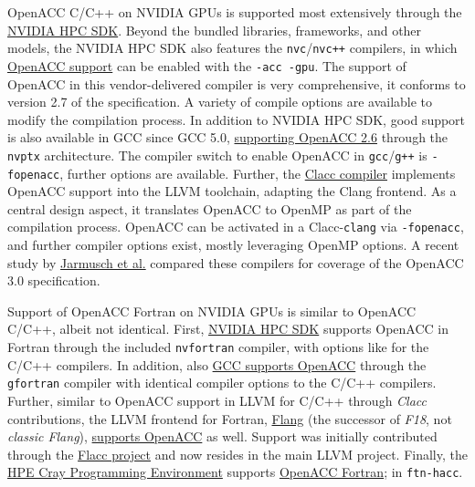 OpenACC C/C++ on NVIDIA GPUs is supported most extensively through the \href{https://developer.nvidia.com/hpc-sdk}{NVIDIA HPC SDK}. Beyond the bundled libraries, frameworks, and other models, the NVIDIA HPC SDK also features the \texttt{nvc}/\texttt{nvc++} compilers, in which \href{https://docs.nvidia.com/hpc-sdk/compilers/hpc-compilers-user-guide/index.html\#acc-use}{OpenACC support} can be enabled with the \texttt{-acc\ -gpu}. The support of OpenACC in this vendor-delivered compiler is very comprehensive, it conforms to version 2.7 of the specification. A variety of compile options are available to modify the compilation process. In addition to NVIDIA HPC SDK, good support is also available in GCC since GCC 5.0, \href{https://gcc.gnu.org/wiki/OpenACC}{supporting OpenACC 2.6} through the \texttt{nvptx} architecture. The compiler switch to enable OpenACC in \texttt{gcc}/\texttt{g++} is \texttt{-fopenacc}, further options are available. Further, the \href{https://csmd.ornl.gov/project/clacc}{Clacc compiler} implements OpenACC support into the LLVM toolchain, adapting the Clang frontend. As a central design aspect, it translates OpenACC to OpenMP as part of the compilation process. OpenACC can be activated in a Clacc-\texttt{clang} via \texttt{-fopenacc}, and further compiler options exist, mostly leveraging OpenMP options. A recent study by \href{https://ieeexplore.ieee.org/document/10029456}{Jarmusch et al.} compared these compilers for coverage of the OpenACC 3.0 specification.   

 Support of OpenACC Fortran on NVIDIA GPUs is similar to OpenACC C/C++, albeit not identical. First, \href{https://developer.nvidia.com/hpc-sdk}{NVIDIA HPC SDK} supports OpenACC in Fortran through the included \texttt{nvfortran} compiler, with options like for the C/C++ compilers. In addition, also \href{https://gcc.gnu.org/wiki/OpenACC}{GCC supports OpenACC} through the \texttt{gfortran} compiler with identical compiler options to the C/C++ compilers. Further, similar to OpenACC support in LLVM for C/C++ through \emph{Clacc} contributions, the LLVM frontend for Fortran, \href{https://flang.llvm.org/docs/}{Flang} (the successor of \emph{F18}, not \emph{classic Flang}), \href{https://flang.llvm.org/docs/OpenACC.html}{supports OpenACC} as well. Support was initially contributed through the \href{https://ieeexplore.ieee.org/document/9651310}{Flacc project} and now resides in the main LLVM project. Finally, the \href{https://www.hpe.com/psnow/doc/a50002303enw}{HPE Cray Programming Environment} supports \href{https://cpe.ext.hpe.com/docs/cce/man7/intro_openacc.7.html}{OpenACC Fortran}; in \texttt{ftn-hacc}.   

